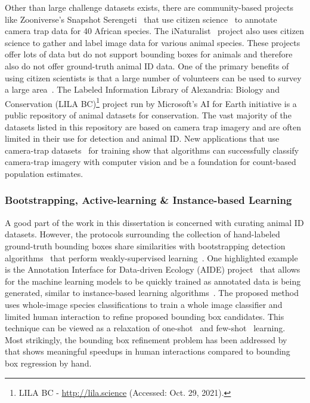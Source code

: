 Other than large challenge datasets exists, there are community-based projects like Zooniverse's Snapshot Serengeti~\cite{simpson_zooniverse:_2014,swanson_snapshot_2015} that use citizen science~\cite{cohn_citizen_2008,irwin_citizen_1995,silvertown_new_2009} to annotate camera trap data for 40 African species.  The iNaturalist~\cite{van_horn_inaturalist_2018} project also uses citizen science to gather and label image data for various animal species.  These projects offer lots of data but do not support bounding boxes for animals and therefore also do not offer ground-truth animal ID data.  One of the primary benefits of using citizen scientists is that a large number of volunteers can be used to survey a large area~\cite{haklay_geographical_2010,kumar_leafsnap:_2012,sullivan_ebird:_2009}.  The Labeled Information Library of Alexandria: Biology and Conservation (LILA BC)\footnote{LILA BC - \url{http://lila.science} (Accessed: Oct. 29, 2021).} project run by Microsoft's AI for Earth initiative is a public repository of animal datasets for conservation.  The vast majority of the datasets listed in this repository are based on camera trap imagery and are often limited in their use for detection and animal ID.  New applications that use camera-trap datasets~\cite{swanson_snapshot_2015,ancrenaz_handbook_2012,forrester_emammalcitizen_2014,maputla_calibrating_2013,norouzzadeh_automatically_2018} for training show that algorithms can successfully classify camera-trap imagery with computer vision and be a foundation for count-based population estimates.

\subsubsection{Bootstrapping, Active-learning \& Instance-based Learning}

A good part of the work in this dissertation is concerned with curating animal ID datasets.  However, the protocols surrounding the collection of hand-labeled ground-truth bounding boxes share similarities with bootstrapping detection algorithms~\cite{eggert_benefit_2015,chen_webly_2015,tong_salient_2015,wan_bootstrapping_2016} that perform weakly-supervised learning~\cite{li_weakly_2016,oquab_weakly_2014}.  One highlighted example is the Annotation Interface for Data-driven Ecology (AIDE) project~\cite{kellenberger_aide_2020} that allows for the machine learning models to be quickly trained as annotated data is being generated, similar to instance-based learning algorithms~\cite{aha_instance-based_1991}.  The proposed method uses whole-image species classifications to train a whole image classifier and limited human interaction to refine proposed bounding box candidates.  This technique can be viewed as a relaxation of one-shot~\cite{zeiler_visualizing_2014,fei-fei_one-shot_2006,thrun_is_1996} and few-shot~\cite{xu_few-shot_2016} learning.  Most strikingly, the bounding box refinement problem has been addressed by~\cite{papadopoulos_we_2016} that shows meaningful speedups in human interactions compared to bounding box regression by hand.

